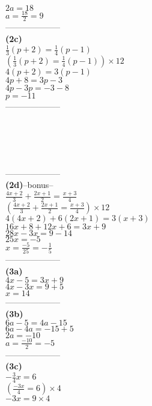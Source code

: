 \documentclass[11pt,a4paper]{article}
\begin{document}
\begin{flushleft}
\begin{minipage}{5.5cm}
$2a=18$\\
$a=\frac{18}{2}=9$\\
{\color{blue} --------------------}\\
{\bf (2c)}\\
$\frac{1}{3}(p+2)=\frac{1}{4}(p-1)$\\
$\left(\frac{1}{3}(p+2)=\frac{1}{4}(p-1)\right)\times 12$\\
$4(p+2)=3(p-1)$\\
$4p+8=3p-3$\\
$4p-3p=-3-8$\\
$p=-11$\\
{\color{blue} --------------------}\\
\\
\\
\\
\\
\end{minipage}
\begin{minipage}{6cm}
{\color{blue} --------------------}\\
{\bf (2d)}--bonus--\\
$\frac{4x+2}{3}+\frac{2x+1}{2}=\frac{x+3}{4}$\\
$\left(\frac{4x+2}{3}+\frac{2x+1}{2}=\frac{x+3}{4}\right)\times 12$\\
$4(4x+2)+6(2x+1)=3(x+3)$\\
$16x+8+12x+6=3x+9$\\
$28x-3x=9-14$\\
$25x=-5$\\
$x=\frac{-5}{25}=-\frac{1}{5}$\\
{\color{blue} --------------------}\\
{\bf (3a)}\\
$4x-5=3x+9$\\
$4x-3x=9+5$\\
$x=14$\\
{\color{blue} --------------------}\\
{\bf (3b)}\\
$6a-5=4a-15$\\
$6a-4a=-15+5$\\
$2a=-10$\\
$a=\frac{-10}{2}=-5$\\
{\color{blue} --------------------}\\
{\bf (3c)}\\
$-\frac{3}{4}x=6$\\
$(\frac{-3x}{4}=6)\times 4$\\
$-3x=9\times 4$\\

\end{minipage}
\end{flushleft}
\end{document}
